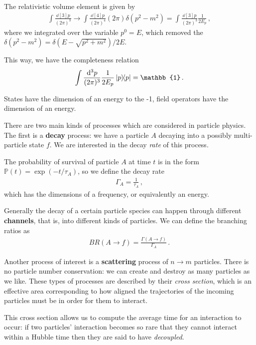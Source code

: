 \documentclass[main.tex]{subfiles}
\begin{document}
The relativistic volume element is given by 
%
\begin{align}
\int \frac{ \dd[3]{p}}{(2\pi )^3} \rightarrow
\int \frac{ \dd[4]{p}}{(2 \pi )^{4}} (2 \pi ) \delta (p^2-m^2)
= \int \frac{ \dd[3]{p}}{(2\pi )^3} \frac{1}{2E_p}
\,,
\end{align}
%
where we integrated over the variable \(p^{0}=E\), which removed the \(\delta (p^2-m^2) = \delta (E - \sqrt{p^2+m^2}) / 2E\). 

This way, we have the completeness relation 
%
\begin{align}
\int \frac{ \dd[3]{p}}{(2 \pi )^3} \frac{1}{2 E_p } \dyad{p} = \mathbb{1}
\,.
\end{align}

States have the dimension of an energy to the -1, field operators have the dimension of an energy. 

There are two main kinds of processes which are considered in particle physics. 
The first is a \textbf{decay} process: we have a particle \(A\) decaying into a possibly multi-particle state \(f\). 
We are interested in the decay \emph{rate} of this process. 

The probability of survival of particle \(A\) at time \(t\) is in the form \(\mathbb{P}(t) = \exp(-t / \tau_{A})\), so we define the decay rate
%
\begin{align}
\Gamma_{A} = \frac{1}{\tau_{A}}
\,,
\end{align}
%
which has the dimensions of a frequency, or equivalently an energy. 

Generally the decay of a certain particle species can happen through different \textbf{channels}, that is, into different kinds of particles.
We can define the branching ratios as 
%
\begin{align}
BR(A \to f) = \frac{ \Gamma (A \to f)}{\Gamma_{A}}
\,.
\end{align}

Another process of interest is a \textbf{scattering} process of \(n \to m \) particles. 
There is no particle number conservation: we can create and destroy as many particles as we like. 
These types of processes are described by their \emph{cross section}, which is an effective area corresponding to how aligned the trajectories of the incoming particles must be in order for them to interact.

This cross section allows us to compute the average time for an interaction to occur: if two particles' interaction becomes so rare that they cannot interact within a Hubble time then they are said to have \emph{decoupled}. 
\end{document}

